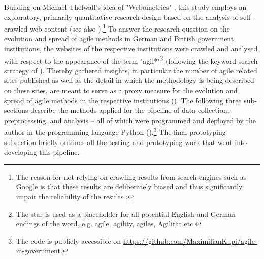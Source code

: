 Building on Michael Thelwall's idea of "Webometrics" \parencite{Thelwall2009}, this study employs an exploratory, primarily quantitative research design based on the analysis of self-crawled web content (see also \cite{Olston2010, Jaeger1998, Ignatow2018}).\footnote{The reason for not relying on crawling results from search engines such as Google is that these results are deliberately biased and thus significantly impair the reliability of the results \parencite{Cothey2004}.} To answer the research question on the evolution and spread of agile methods in German and British government institutions, the websites of the respective institutions were crawled and analysed with respect to the appearance of the term "agil*"\footnote{The star is used as a placeholder for all potential English and German endings of the word, e.g. agile, agility, agiles, Agilität etc.} (following the keyword search strategy of \cite{Mergel2018}). Thereby gathered insights, in particular the number of agile related sites published as well as the detail in which the methodology is being described on these sites, are meant to serve as a proxy measure for the evolution and spread of agile methods in the respective institutions (\cite{Branco2006, Ghosh2013}). The following three sub-sections describe the methods applied for the pipeline of data collection, preprocessing, and analysis – all of which were programmed and deployed by the author in the programming language Python (\cite{VanRossum1995}).\footnote{The code is publicly accessible on \url{https://github.com/MaximilianKupi/agile-in-government}.} The final prototyping subsection briefly outlines all the testing and prototyping work that went into developing this pipeline.


